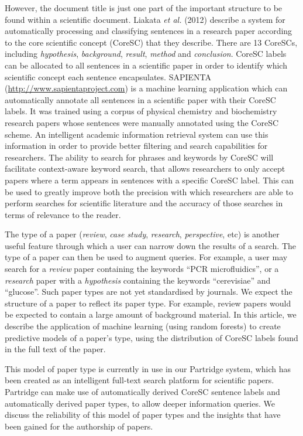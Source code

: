 \documentclass{svmult}
\begin{document}
However, the document title is just one part of the important structure to be found within a scientific document.
Liakata \emph{et al.} (2012) describe a system for automatically processing and classifying sentences in a research paper according to the core scientific concept (CoreSC) that they describe\cite{Liakata2012}. 
There are 13 CoreSCs, including {\em hypothesis}, {\it background}, {\em result}, {\em method} and {\em conclusion}.
CoreSC labels can be allocated to all sentences in a scientific paper in order to identify which scientific concept each sentence encapsulates.
SAPIENTA (\url{http://www.sapientaproject.com}) is a machine learning application which can automatically annotate all sentences in a scientific paper with their CoreSC labels. It was trained using a corpus of physical chemistry and biochemistry research papers whose sentences were manually annotated using the CoreSC\cite{LIAKATA10.644} scheme. 
An intelligent academic information retrieval system can use this information in order to provide better filtering and search capabilities for researchers. 
The ability to search for phrases and keywords by CoreSC will facilitate context-aware keyword search, that allows researchers to only accept papers where a term appears in sentences with a specific CoreSC label.
This can be used to greatly improve both the precision with which researchers are able to perform searches for scientific literature and the accuracy of those searches in terms of relevance to the reader.

The type of a paper ({\em review}, {\em case study}, {\em research}, {\em perspective}, etc) is another useful feature through which a user can narrow down the results of a search. 
The type of a paper can then be used to augment queries.
For example, a user may search for a {\em review} paper containing the keywords ``PCR microfluidics'', or a {\em research} paper with a {\em hypothesis} containing the keywords ``cerevisiae'' and ``glucose''.   
Such paper types are not yet standardised by journals.
We expect the structure of a paper to reflect its paper type. 
For example, review papers would be expected to contain a large amount of background material.
In this article, we describe the application of machine learning (using random forests) to create predictive models of a paper's type, using the distribution of CoreSC labels found in the full text of the paper. 

This model of paper type is currently in use in our Partridge system, which has been created as an intelligent full-text search platform for scientific papers. 
Partridge can make use of automatically derived CoreSC sentence labels and automatically derived paper types, to allow deeper information queries.  
We discuss the reliability of this model of paper types and the insights that have been gained for the authorship of papers.
\end{document}
